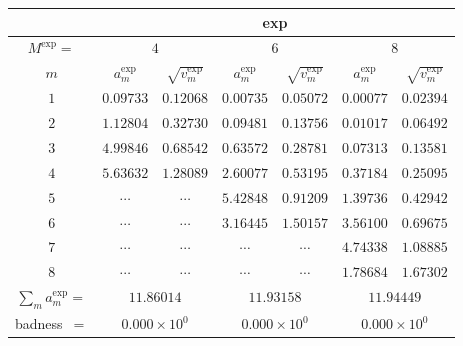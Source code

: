 \begin{tabular}{c|cc|cc|cc|}
&
\multicolumn{6}{|c|}{exp} \\
\hline
$M^{\exp}=$ &
 \multicolumn{2}{|c|}{$4$} &
 \multicolumn{2}{|c|}{$6$} &
 \multicolumn{2}{|c|}{$8$} \\
$m$ &
 $a^{\exp}_m$ & $\sqrt{v^{\exp}_m}$ &
 $a^{\exp}_m$ & $\sqrt{v^{\exp}_m}$ &
 $a^{\exp}_m$ & $\sqrt{v^{\exp}_m}$ \\
$1$ &
 $0.09733$ & $0.12068$ &
 $0.00735$ & $0.05072$ &
 $0.00077$ & $0.02394$ \\
$2$ &
 $1.12804$ & $0.32730$ &
 $0.09481$ & $0.13756$ &
 $0.01017$ & $0.06492$ \\
$3$ &
 $4.99846$ & $0.68542$ &
 $0.63572$ & $0.28781$ &
 $0.07313$ & $0.13581$ \\
$4$ &
 $5.63632$ & $1.28089$ &
 $2.60077$ & $0.53195$ &
 $0.37184$ & $0.25095$ \\
$5$ &
 $\cdots$ & $\cdots$ &
 $5.42848$ & $0.91209$ &
 $1.39736$ & $0.42942$ \\
$6$ &
 $\cdots$ & $\cdots$ &
 $3.16445$ & $1.50157$ &
 $3.56100$ & $0.69675$ \\
$7$ &
 $\cdots$ & $\cdots$ &
 $\cdots$ & $\cdots$ &
 $4.74338$ & $1.08885$ \\
$8$ &
 $\cdots$ & $\cdots$ &
 $\cdots$ & $\cdots$ &
 $1.78684$ & $1.67302$ \\
\hline
$\sum_m a^{\exp}_m=$ &
 \multicolumn{2}{|c|}{$11.86014$} &
 \multicolumn{2}{|c|}{$11.93158$} &
 \multicolumn{2}{|c|}{$11.94449$} \\
badness~$=$ &
 \multicolumn{2}{|c|}{$0.000\times 10^{0}$} &
 \multicolumn{2}{|c|}{$0.000\times 10^{0}$} &
 \multicolumn{2}{|c|}{$0.000\times 10^{0}$} \\
\end{tabular}
